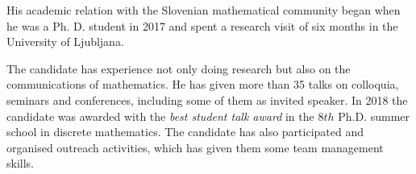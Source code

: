 His academic relation with the Slovenian mathematical community began when he was a Ph. D. student in 2017 and spent a research visit of six months in the University of Ljubljana.

The candidate has experience not only doing research but also on the communications of mathematics.
He has given more than 35 talks on colloquia, seminars and conferences, including some of them as invited speaker.
In 2018 the candidate was awarded with the \emph{best student talk award} in the $8th$ Ph.D. summer school in discrete mathematics.
The candidate has also participated and organised outreach activities, which has given them some team management skills.
